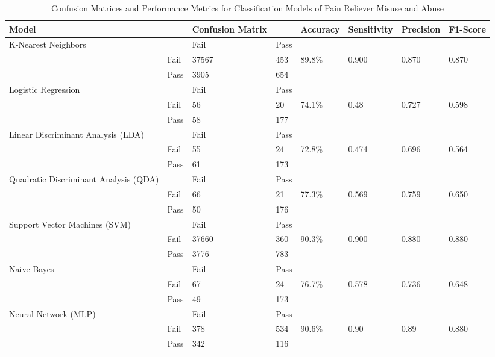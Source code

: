 \documentclass[sigconf]{acmart}
\begin{document}
\begin{table*}[ht]
  \caption{Confusion Matrices and Performance Metrics for Classification 
  Models of Pain Reliever Misuse and Abuse}
  \label{tab:freq}
  \begin{tabular}{llllllll}
    \toprule
    Model& & Confusion Matrix & & Accuracy & Sensitivity & Precision & F1-Score \\
    \midrule
    K-Nearest Neighbors & & Fail & Pass &  &  &  & \\
     & Fail & 37567 & 453 & 89.8\% & 0.900 & 0.870 & 0.870 \\
     & Pass & 3905 & 654 &  &  &  & \\
    
    \midrule
    Logistic Regression & & Fail & Pass &  &  &  & \\
     & Fail & 56 &  20 & 74.1\% & 0.48 & 0.727 & 0.598 \\
     & Pass & 58 & 177 &  &  &  & \\
    \midrule
    Linear Discriminant Analysis (LDA) & & Fail & Pass &  &  &  & \\
     & Fail & 55 &  24 & 72.8\% & 0.474 & 0.696 & 0.564 \\
     & Pass & 61 & 173 &  &  &  & \\
    \midrule
    Quadratic Discriminant Analysis (QDA) & & Fail & Pass &  &  &  & \\
     & Fail & 66 &  21 & 77.3\% & 0.569 & 0.759 & 0.650 \\
     & Pass & 50 & 176 &  &  &  & \\
    
    \midrule
    Support Vector Machines (SVM) & & Fail & Pass &  &  &  & \\
     & Fail & 37660 & 360 & 90.3\% & 0.900 & 0.880 & 0.880 \\
     & Pass & 3776 & 783 &  &  &  & \\
    \midrule
    Naive Bayes & & Fail & Pass &  &  &  & \\
     & Fail & 67 &  24 & 76.7\% & 0.578 & 0.736 & 0.648 \\
     & Pass & 49 & 173 &  &  &  & \\
    \midrule
    Neural Network (MLP) & & Fail & Pass &  &  &  & \\
     & Fail & 378 & 534 & 90.6\% & 0.90 & 0.89 & 0.880 \\
     & Pass & 342 & 116 &  &  &  & \\
    

\end{tabular}
\end{table*}
\end{document}
